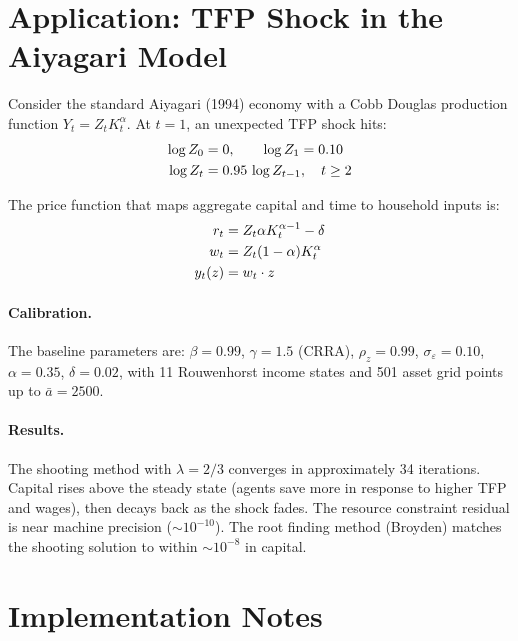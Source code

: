 \documentclass[12pt]{article}
\begin{document}
\section{Application: TFP Shock in the Aiyagari Model}
\label{sec:application}

Consider the standard Aiyagari (1994) economy with a Cobb Douglas production function $Y_t = Z_t K_t^\alpha$. At $t = 1$, an unexpected TFP shock hits:
\begin{align}
    \log Z_0 &= 0, \qquad \log Z_1 = 0.10 \label{eq:shock} \\
    \log Z_t &= 0.95 \, \log Z_{t-1}, \quad t \geq 2 \notag
\end{align}

The price function that maps aggregate capital and time to household inputs is:
\begin{align}
    r_t &= Z_t \alpha K_t^{\alpha - 1} - \delta \notag \\
    w_t &= Z_t (1 - \alpha) K_t^{\alpha} \notag \\
    y_t(z) &= w_t \cdot z \label{eq:price_fn}
\end{align}

\paragraph{Calibration.} The baseline parameters are: $\beta = 0.99$, $\gamma = 1.5$ (CRRA), $\rho_z = 0.99$, $\sigma_\varepsilon = 0.10$, $\alpha = 0.35$, $\delta = 0.02$, with 11 Rouwenhorst income states and 501 asset grid points up to $\bar{a} = 2500$.

\paragraph{Results.} The shooting method with $\lambda = 2/3$ converges in approximately 34 iterations. Capital rises above the steady state (agents save more in response to higher TFP and wages), then decays back as the shock fades. The resource constraint residual is near machine precision ($\sim 10^{-10}$). The root finding method (Broyden) matches the shooting solution to within $\sim 10^{-8}$ in capital.

\section{Implementation Notes}
\label{sec:implementation}
\end{document}
